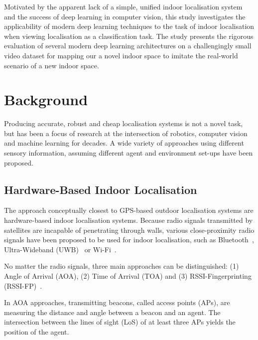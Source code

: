 \documentclass[a4paper]{article}
\begin{document}
  Motivated by the apparent lack of a simple, unified indoor localisation system
  and the success of deep learning in computer vision, this study investigates
  the applicability of modern deep learning techniques to the task of indoor
  localisation when viewing localisation as a classification task. The study
  presents the rigorous evaluation of several modern deep learning architectures
  on a challengingly small video dataset for mapping our a novel indoor space to
  imitate the real-world scenario of a new indoor space.


  \section{Background} %
  \label{sec:background}

  Producing accurate, robust and cheap localisation systems is not a novel task,
  but has been a focus of research at the intersection of robotics, computer
  vision and machine learning for decades. A wide variety of approaches using
  different sensory information, assuming different agent and environment
  set-ups have been proposed.

  \subsection{Hardware-Based Indoor Localisation} %
  \label{sub:hardware-based-indoor-localisation}

  The approach conceptually closest to GPS-based outdoor localisation systems
  are hardware-based indoor localisation systems. Because radio signals
  transmitted by satellites are incapable of penetrating through walls, various
  close-proximity radio signals have been proposed to be used for indoor
  localisation, such as Bluetooth~\cite{bluetooth1, bluetooth2}, Ultra-Wideband
  (UWB)~\cite{uwb1, uwb2} or Wi-Fi~\cite{survey1, survey2}.

  No matter the radio signals, three main approaches can be distinguished:
  (1) Angle of Arrival (AOA), (2) Time of Arrival (TOA) and (3)
  RSSI-Fingerprinting (RSSI-FP)~\cite{survey2}. 

  In AOA approaches, transmitting beacons, called access points (APs), are
  measuring the distance and angle between a beacon and an agent. The
  intersection between the lines of sight (LoS) of at least three APs yields
  the position of the agent. 
\end{document}
